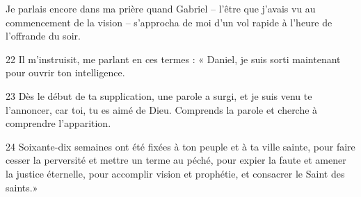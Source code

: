 Je parlais encore dans ma prière quand Gabriel – l’être que j’avais vu au commencement de la vision – s’approcha de moi d’un vol rapide à l’heure de l’offrande du soir.

22 Il m’instruisit, me parlant en ces termes : « Daniel, je suis sorti maintenant pour ouvrir ton intelligence.

23 Dès le début de ta supplication, une parole a surgi, et je suis venu te l’annoncer, car toi, tu es aimé de Dieu. Comprends la parole et cherche à comprendre l’apparition.

24 Soixante-dix semaines ont été fixées à ton peuple et à ta ville sainte, pour faire cesser la perversité et mettre un terme au péché, pour expier la faute et amener la justice éternelle, pour accomplir vision et prophétie, et consacrer le Saint des saints.»
